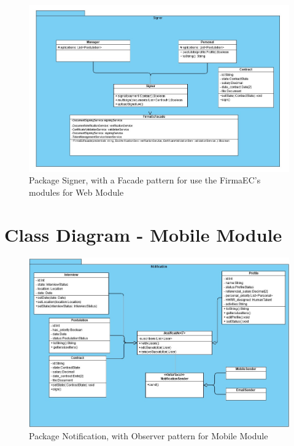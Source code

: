 \documentclass{scrreprt}
\begin{document}
\begin{figure}[H]
	\centering  \small
	\includegraphics[width=\textwidth]{DC/DC6.jpg} 
	\caption{Package Signer, with a Facade pattern for use the FirmaEC's modules for Web Module}
	\label{fig:Clase6}
\end{figure}


\section{Class Diagram - Mobile Module}


\begin{figure}[H]
	\centering  \small
	\includegraphics[width=\textwidth]{DC/DC7.jpg} 
	\caption{Package Notification, with Observer pattern for Mobile Module}
	\label{fig:Clase7}
\end{figure}
\end{document}

